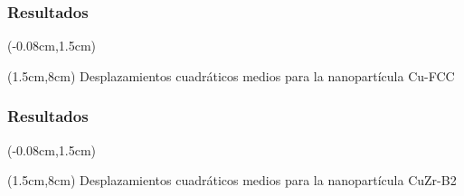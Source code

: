 %  
%  

\begin{frame}
 \frametitle{Resultados}
 
 \begin{textblock*}{12.6cm}(-0.08cm,1.5cm) 
      \begin{figure}[htp]
	\centering
      \end{figure}
    \end{textblock*}
    \begin{textblock*}{10cm}(1.5cm,8cm) 
    \centering
      Desplazamientos cuadr\'aticos medios para la nanopart\'icula Cu-FCC
 \end{textblock*}
\end{frame}

\begin{frame}
 \frametitle{Resultados}
 
 \begin{textblock*}{12.6cm}(-0.08cm,1.5cm) 
      \begin{figure}[htp]
	\centering
      \end{figure}
    \end{textblock*}
    \begin{textblock*}{10cm}(1.5cm,8cm) 
    \centering
      Desplazamientos cuadr\'aticos medios para la nanopart\'icula CuZr-B2
 \end{textblock*}
\end{frame}

